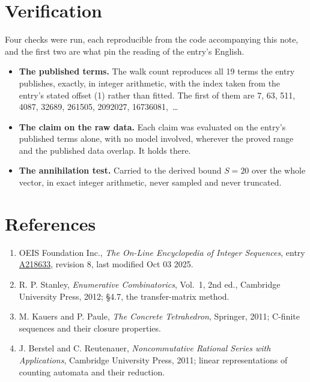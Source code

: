 \documentclass[11pt]{article}
\theoremstyle{definition}
\begin{document}
\section{Verification}

Four checks were run, each reproducible from the code accompanying this note, and the first two are what pin the reading of the entry's English.

\begin{itemize}

\item {\bfseries The published terms.} The walk count reproduces all 19 terms the entry publishes, exactly, in integer arithmetic, with the index taken from the entry's stated offset (1) rather than fitted. The first of them are 7, 63, 511, 4087, 32689, 261505, 2092027, 16736081,~\dots

\item {\bfseries The claim on the raw data.} Each claim was evaluated on the entry's published terms alone, with no model involved, wherever the proved range and the published data overlap. It holds there.

\item {\bfseries The annihilation test.} Carried to the derived bound $S = 20$ over the whole vector, in exact integer arithmetic, never sampled and never truncated.

\end{itemize}

\section{References}

\begin{enumerate}

\item OEIS Foundation Inc., \emph{The On-Line Encyclopedia of Integer Sequences}, entry \href{https://oeis.org/A218633}{A218633}, revision 8, last modified Oct 03 2025.

\item R. P. Stanley, \emph{Enumerative Combinatorics}, Vol.~1, 2nd ed., Cambridge University Press, 2012; \S4.7, the transfer-matrix method.

\item M. Kauers and P. Paule, \emph{The Concrete Tetrahedron}, Springer, 2011; C-finite sequences and their closure properties.

\item J. Berstel and C. Reutenauer, \emph{Noncommutative Rational Series with Applications}, Cambridge University Press, 2011; linear representations of counting automata and their reduction.

\end{enumerate}
\end{document}
